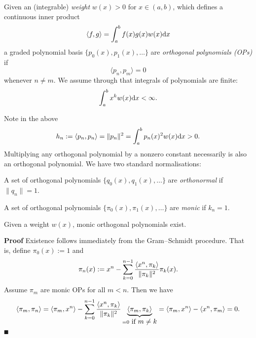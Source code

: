 \begin{definition} Given an (integrable) \emph{weight} $w(x) > 0$ for $x \ensuremath{\in} (a,b)$, which defines a continuous inner product
\[
\ensuremath{\langle}f,g\ensuremath{\rangle} = \ensuremath{\int}_a^b  f(x) g(x) w(x) {\rm d} x
\]
a graded polynomial basis $\{p_0(x), p_1(x), \ensuremath{\ldots} \}$ are \emph{orthogonal polynomials (OPs)} if
\[
\ensuremath{\langle}p_n,p_m\ensuremath{\rangle} = 0
\]
whenever $n \ensuremath{\neq} m$. We assume through that integrals of polynomials are finite:
\[
\ensuremath{\int}_a^b  x^k w(x) {\rm d} x < \ensuremath{\infty}.
\]
\end{definition}

Note in the above
\[
h_n := \ensuremath{\langle}p_n,p_n\ensuremath{\rangle} = \|p_n\|^2 = \ensuremath{\int}_a^b  p_n(x)^2 w(x) {\rm d} x > 0.
\]
Multiplying any orthogonal polynomial by a nonzero constant necessarily is also an orthogonal polynomial. We have two standard normalisations:

\begin{definition} A set of orthogonal polynomials $\{q_0(x), q_1(x), \ensuremath{\ldots} \}$ are \emph{orthonormal} if $\|q_n\| = 1$. \end{definition}

\begin{definition} A set of orthogonal polynomials $\{\ensuremath{\pi}_0(x), \ensuremath{\pi}_1(x), \ensuremath{\ldots} \}$ are \emph{monic} if $k_n = 1$. \end{definition}

\begin{proposition}[existence] Given a weight $w(x)$, monic orthogonal polynomials exist.

\end{proposition}
\textbf{Proof} Existence follows immediately from the Gram\ensuremath{\endash}Schmidt procedure. That is, define $\ensuremath{\pi}_0(x) := 1$ and
\[
\ensuremath{\pi}_n(x) := x^n - \ensuremath{\sum}_{k=0}^{n-1} {\ensuremath{\langle}x^n,\ensuremath{\pi}_k\ensuremath{\rangle} \over \|\ensuremath{\pi}_k\|^2} \ensuremath{\pi}_k(x).
\]
Assume $\ensuremath{\pi}_m$ are monic OPs for all $m < n$. Then we have
\[
\ensuremath{\langle}\ensuremath{\pi}_m, \ensuremath{\pi}_n\ensuremath{\rangle} = \ensuremath{\langle}\ensuremath{\pi}_m, x^n \ensuremath{\rangle} - \ensuremath{\sum}_{k=0}^{n-1} {\ensuremath{\langle}x^n,\ensuremath{\pi}_k\ensuremath{\rangle} \over \|\ensuremath{\pi}_k\|^2} \underbrace{\ensuremath{\langle}\ensuremath{\pi}_m, \ensuremath{\pi}_k\ensuremath{\rangle}}_{= 0 \hbox{ if $m \ensuremath{\neq} k$}}  = \ensuremath{\langle}\ensuremath{\pi}_m, x^n \ensuremath{\rangle} - \ensuremath{\langle}x^n,\ensuremath{\pi}_m\ensuremath{\rangle} = 0.
\]
\ensuremath{\QED}

